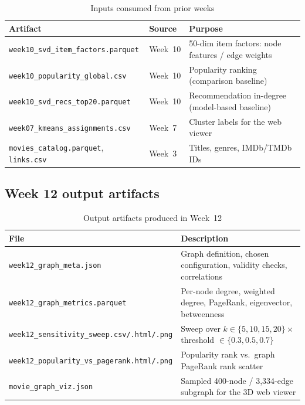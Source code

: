 \documentclass[12pt,a4paper]{article}
\begin{document}
\begin{table}[H]
\centering
\caption{Inputs consumed from prior weeks}
\begin{tabular}{lll}
\toprule
\textbf{Artifact} & \textbf{Source} & \textbf{Purpose} \\
\midrule
\texttt{week10\_svd\_item\_factors.parquet} & Week~10 & 50-dim item factors: node features / edge weights \\
\texttt{week10\_popularity\_global.csv} & Week~10 & Popularity ranking (comparison baseline) \\
\texttt{week10\_svd\_recs\_top20.parquet} & Week~10 & Recommendation in-degree (model-based baseline) \\
\texttt{week07\_kmeans\_assignments.csv} & Week~7 & Cluster labels for the web viewer \\
\texttt{movies\_catalog.parquet}, \texttt{links.csv} & Week~3 & Titles, genres, IMDb/TMDb IDs \\
\bottomrule
\end{tabular}
\end{table}

\subsection{Week 12 output artifacts}

\begin{table}[H]
\centering
\caption{Output artifacts produced in Week~12}
\begin{tabular}{ll}
\toprule
\textbf{File} & \textbf{Description} \\
\midrule
\texttt{week12\_graph\_meta.json} & Graph definition, chosen configuration, validity checks, correlations \\
\texttt{week12\_graph\_metrics.parquet} & Per-node degree, weighted degree, PageRank, eigenvector, betweenness \\
\texttt{week12\_sensitivity\_sweep.csv/.html/.png} & Sweep over $k \in \{5,10,15,20\} \times$ threshold $\in \{0.3,0.5,0.7\}$ \\
\texttt{week12\_popularity\_vs\_pagerank.html/.png} & Popularity rank vs.\ graph PageRank rank scatter \\
\texttt{movie\_graph\_viz.json} & Sampled 400-node / 3,334-edge subgraph for the 3D web viewer \\
\bottomrule
\end{tabular}
\end{table}

\end{document}
